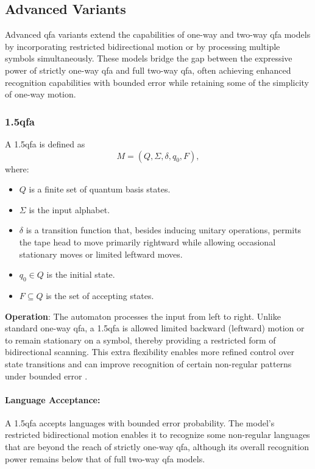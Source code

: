 \subsection{Advanced Variants}
\label{subsec:advanced-variants}

Advanced \gls{qfa} variants extend the capabilities of one-way and two-way qfa models by incorporating restricted bidirectional motion or by processing multiple symbols simultaneously. These models bridge the gap between the expressive power of strictly one-way qfa and full two-way qfa, often achieving enhanced recognition capabilities with bounded error while retaining some of the simplicity of one-way motion.

\subsubsection{\gls{1.5qfa}}
\label{sssec:1.5qfa}
\begin{definition}
A \gls{1.5qfa} is defined as 
\[
M = (Q, \Sigma, \delta, q_0, F),
\]
where:
\begin{itemize}
    \item \( Q \) is a finite set of quantum basis states.
    \item \( \Sigma \) is the input alphabet.
    \item \( \delta \) is a transition function that, besides inducing unitary operations, permits the tape head to move primarily rightward while allowing occasional stationary moves or limited leftward moves.
    \item \( q_0 \in Q \) is the initial state.
    \item \( F \subseteq Q \) is the set of accepting states.
\end{itemize}
\end{definition}

\textbf{Operation}:  
The automaton processes the input from left to right. Unlike standard one-way \gls{qfa}, a \gls{1.5qfa} is allowed limited backward (leftward) motion or to remain stationary on a symbol, thereby providing a restricted form of bidirectional scanning. This extra flexibility enables more refined control over state transitions and can improve recognition of certain non-regular patterns under bounded error \cite{kondacs1997power}.

\paragraph{Language Acceptance:}  
A \gls{1.5qfa} accepts languages with bounded error probability. The model’s restricted bidirectional motion enables it to recognize some non-regular languages that are beyond the reach of strictly one-way qfa, although its overall recognition power remains below that of full two-way qfa models.

